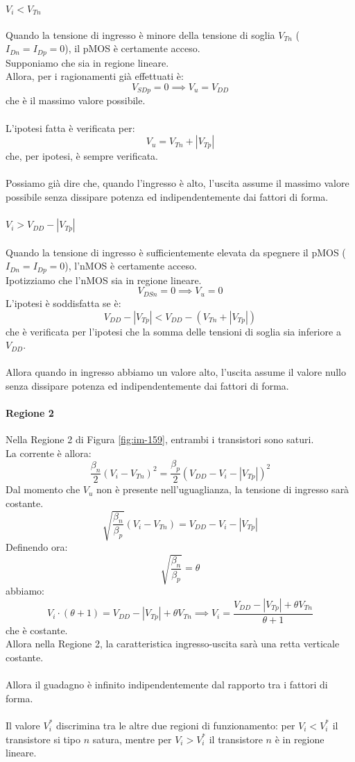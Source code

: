 \documentclass[../main.tex]{subfiles}
\begin{document}
	\paragraph{$V_i < V_{Tn}$}
	Quando la tensione di ingresso è minore della tensione di soglia $V_{Tn}$ ($I_{Dn} = I_{Dp} = 0$), il pMOS è certamente acceso.\\
	Supponiamo che sia in regione lineare.\\
	Allora, per i ragionamenti già effettuati è:
	$$V_{SDp} = 0 \implies V_u = V_{DD}$$
	che è il massimo valore possibile.\\\\
	L'ipotesi fatta è verificata per:
	$$V_u = V_{Tn} + |V_{Tp}|$$
	che, per ipotesi, è sempre verificata.\\\\
	Possiamo già dire che, quando l'ingresso è alto, l'uscita assume il massimo valore possibile senza dissipare potenza ed indipendentemente dai fattori di forma.
	\paragraph{$V_i > V_{DD} - \left| V_{Tp} \right|$}
	Quando la tensione di ingresso è sufficientemente elevata da spegnere il pMOS ($I_{Dn} = I_{Dp} = 0$), l'nMOS è certamente acceso.\\
	Ipotizziamo che l'nMOS sia in regione lineare.
	$$V_{DSn} = 0 \implies V_u = 0$$
	L'ipotesi è soddisfatta se è:
	$$V_{DD} - |V_{Tp}| < V_{DD} - (V_{Tn} + |V_{Tp}|)$$
	che è verificata per l'ipotesi che la somma delle tensioni di soglia sia inferiore a $V_{DD}$.\\\\
	Allora quando in ingresso abbiamo un valore alto, l'uscita assume il valore nullo senza dissipare potenza ed indipendentemente dai fattori di forma.
	\paragraph{Regione 2}
	Nella Regione 2 di Figura \ref{fig:im-159}, entrambi i transistori sono saturi.\\
	La corrente è allora:
	$$\frac{\beta_n}{2} (V_i - V_{Tn})^2 = \frac{\beta_p}{2} (V_{DD} - V_i - |V_{Tp}|)^2$$
	Dal momento che $V_u$ non è presente nell'uguaglianza, la tensione di ingresso sarà costante.
	$$\sqrt{\frac{\beta_n}{\beta_p}} (V_i - V_{Tn}) = V_{DD} - V_i - |V_{Tp}|$$
	Definendo ora:
	$$\sqrt{\frac{\beta_n}{\beta_p}} = \theta$$
	abbiamo:
	$$V_i \cdot (\theta + 1) = V_{DD} - |V_{Tp}| + \theta V_{Tn} \implies V_i = \frac{V_{DD} - |V_{Tp}| + \theta V_{Tn}}{\theta + 1}$$
	che è costante.\\
	Allora nella Regione 2, la caratteristica ingresso-uscita sarà una retta verticale costante.\\\\
	Allora il guadagno è infinito indipendentemente dal rapporto tra i fattori di forma.\\\\
	Il valore $V_i^*$ discrimina tra le altre due regioni di funzionamento: per $V_i < V_i^*$ il transistore si tipo $n$ satura, mentre per $V_i > V_i^*$ il transistore $n$ è in regione lineare.
\end{document}
